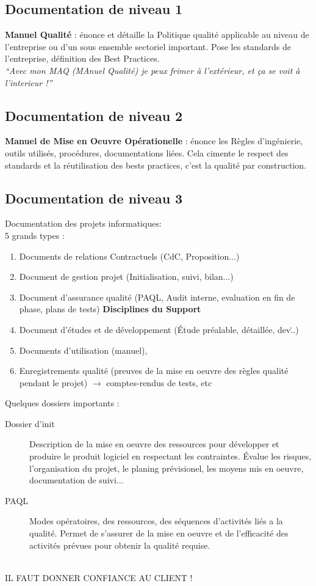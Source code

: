 	\subsection{Documentation de niveau 1}

\textbf{Manuel Qualité} : énonce et détaille la Politique qualité applicable au niveau de l’entreprise ou d’un sous ensemble sectoriel important. 
Pose les standards de l’entreprise, définition des Best Practices.\\

\textit{“Avec mon MAQ (MAnuel Qualité) je peux frimer à l’extérieur, et ça se voit à l’interieur !”}

	\subsection{Documentation de niveau 2}

\textbf{Manuel de Mise en Oeuvre Opérationelle} : énonce les Règles d’ingénierie, outils utilisés, procédures, documentations liées.
Cela cimente le respect des standards et la réutilisation des bests practices, c’est la qualité par construction.

	\subsection{Documentation de niveau 3}

Documentation des projets informatiques: \\

5 grands types : 
\begin{enumerate}
\item Documents de relations Contractuels (CdC, Proposition...)
\item Document de gestion projet (Initialisation, suivi, bilan...)
\item Document d’assurance qualité (PAQL, Audit interne, evaluation en fin de phase, plans de tests) \textbf{Disciplines du Support}
\item Document d’études et de développement (Étude préalable, détaillée, dev\...)
\item Documents d’utilisation (manuel), 
\item Enregistrements qualité (preuves de la mise en oeuvre des règles qualité pendant le projet) $\rightarrow$ comptes-rendus de tests, etc
\end{enumerate}

Quelques dossiers importants :
\begin{description}
\item[Dossier d’init] Description de la mise en oeuvre des ressources pour développer et produire le produit logiciel en respectant les contraintes. 
Évalue les risques, l’organisation du projet, le planing prévisionel, les moyens mis en oeuvre, documentation de suivi...

\item[PAQL] Modes opératoires, des ressources, des séquences d’activités liés a la qualité. Permet de s’assurer de la mise en oeuvre et de l’efficacité des activités prévues pour obtenir la qualité requise.
\end{description}
\hfill\\
IL FAUT DONNER CONFIANCE AU CLIENT !

